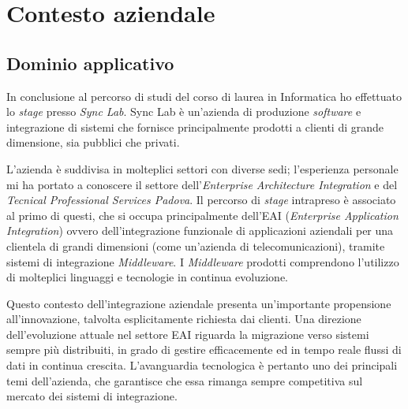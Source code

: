 \chapter{Contesto aziendale}

\section{Dominio applicativo}
In conclusione al percorso di studi del corso di laurea in Informatica ho effettuato lo \textit{stage} presso \textit{Sync Lab}.
Sync Lab è un'azienda di produzione \textit{software} e integrazione di sistemi che fornisce principalmente prodotti a clienti di grande dimensione, sia pubblici che privati.

L'azienda è suddivisa in molteplici settori con diverse sedi; l'esperienza personale mi ha portato a conoscere il settore dell'\textit{Enterprise Architecture Integration} e del \textit{Tecnical Professional Services Padova}.
Il percorso di \textit{stage} intrapreso è associato al primo di questi, che si occupa principalmente dell'EAI (\textit{Enterprise Application Integration}) ovvero dell'integrazione funzionale di applicazioni aziendali per una clientela di grandi dimensioni (come un'azienda di telecomunicazioni), tramite sistemi di integrazione \textit{Middleware}.
I \textit{Middleware} prodotti comprendono l'utilizzo di molteplici linguaggi e tecnologie in continua evoluzione.

Questo contesto dell'integrazione aziendale presenta un'importante propensione all'innovazione, talvolta esplicitamente richiesta dai clienti.
Una direzione dell'evoluzione attuale nel settore EAI riguarda la migrazione verso sistemi sempre più distribuiti, in grado di gestire efficacemente ed in tempo reale flussi di dati in continua crescita.
L'avanguardia tecnologica è pertanto uno dei principali temi dell'azienda, che garantisce che essa rimanga sempre competitiva sul mercato dei sistemi di integrazione.



